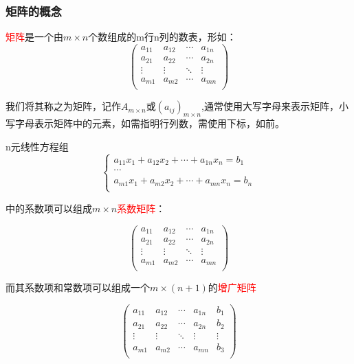 \subsubsection{矩阵的概念}

\begin{definition}
	\textcolor{red}{矩阵}是一个由$m\times n$个数组成的m行n列的数表，形如：
	$$
	\begin{pmatrix}
	a_{11} &a_{12}&\cdots&a_{1n}\\
	a_{21}&a_{22}&\cdots&a_{2n}\\
	\vdots&\vdots&\ddots&\vdots\\
	a_{m1}&a_{m2}&\cdots&a_{mn}\\
	\end{pmatrix}
	$$

	我们将其称之为矩阵，记作$A_{m\times n}$或$(a_{ij})_{m\times n}$,通常使用大写字母来表示矩阵，小写字母表示矩阵中的元素，如需指明行列数，需使用下标，如前。
\end{definition}

n元线性方程组
$$
\begin{cases}
	a_{11}x_1+a_{12}{x_2}+\cdots+a_{1n}x_n=b_1\\
	\cdots\\
	a_{m1}x_1+a_{m2}x_2+\cdots+a_{mn}x_n=b_n\\
\end{cases}
$$

中的系数项可以组成$m\times n$\textcolor{red}{系数矩阵}：

	$$
\begin{pmatrix}
	a_{11} &a_{12}&\cdots&a_{1n}\\
	a_{21}&a_{22}&\cdots&a_{2n}\\
	\vdots&\vdots&\ddots&\vdots\\
	a_{m1}&a_{m2}&\cdots&a_{mn}\\
\end{pmatrix}
$$

而其系数项和常数项可以组成一个$m\times (n+1)$的\textcolor{red}{增广矩阵}

	$$
\begin{pmatrix}
	a_{11} &a_{12}&\cdots&a_{1n}&b_1\\
	a_{21}&a_{22}&\cdots&a_{2n}&b_2\\
	\vdots&\vdots&\ddots&\vdots&\vdots\\
	a_{m1}&a_{m2}&\cdots&a_{mn}&b_3\\
\end{pmatrix}
$$

